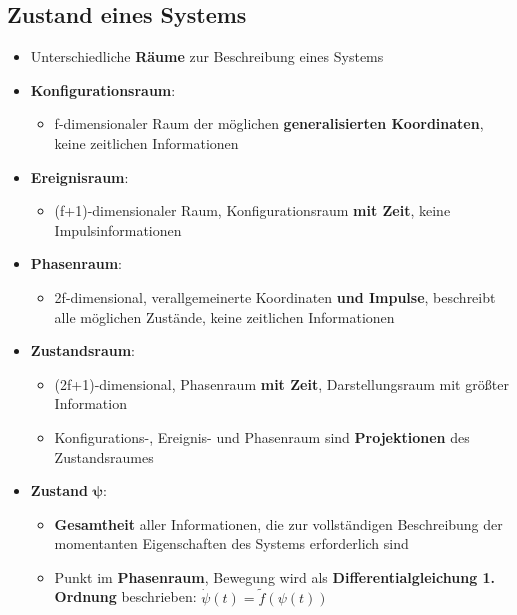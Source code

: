 \subsection{Zustand eines Systems}
\label{hform:sub:zustand_eines_systems}

\begin{itemize}
	\item Unterschiedliche \textbf{Räume} zur Beschreibung eines Systems
	\item \textbf{Konfigurationsraum}:
	\begin{itemize}
		\item f-dimensionaler Raum der möglichen \textbf{generalisierten Koordinaten}, keine zeitlichen Informationen
	\end{itemize}
	\item \textbf{Ereignisraum}:
	\begin{itemize}
		\item (f+1)-dimensionaler Raum, Konfigurationsraum \textbf{mit Zeit}, keine Impulsinformationen
	\end{itemize}
	\item \textbf{Phasenraum}:
	\begin{itemize}
		\item 2f-dimensional, verallgemeinerte Koordinaten \textbf{und Impulse}, beschreibt alle möglichen Zustände, keine zeitlichen Informationen
	\end{itemize}
	\item \textbf{Zustandsraum}:
	\begin{itemize}
		\item (2f+1)-dimensional, Phasenraum \textbf{mit Zeit}, Darstellungsraum mit größter Information
		\item Konfigurations-, Ereignis- und Phasenraum sind \textbf{Projektionen} des Zustandsraumes
	\end{itemize}
	\item \textbf{Zustand} $\mathbf{\psi}$:
	\begin{itemize}
		\item \textbf{Gesamtheit} aller Informationen, die zur vollständigen Beschreibung der momentanten Eigenschaften des Systems erforderlich sind
		\item Punkt im \textbf{Phasenraum}, Bewegung wird als \textbf{Differentialgleichung 1. Ordnung} beschrieben: $\dot{\psi}(t) = \widetilde{f}(\psi(t))$
	\end{itemize}
\end{itemize}